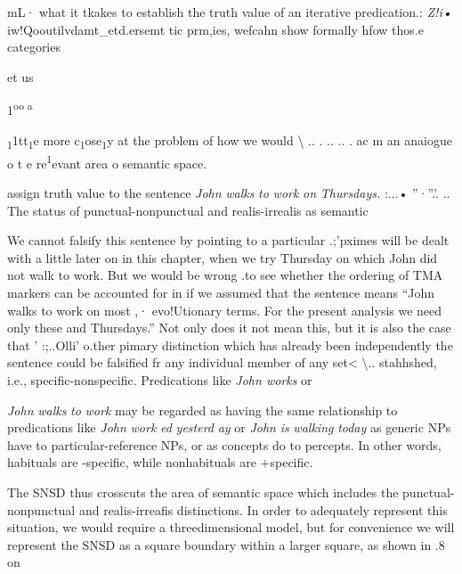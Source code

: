 mL· what it tkakes to establish the truth value of an iterative predication.: \textit{Z}\textit{!i•} iw!Qooutilvdamt\_etd.ersemt tic prm,ies, wefcahn show formally hfow thos.e categories

et us

1\textsuperscript{oo a}

\textsubscript{1}1tt\textsubscript{1}e more c\textsubscript{1}ose\textsubscript{1}y at the problem of how we would {\textbackslash} .. . .. .. . ac m an anaiogue o t e re\textsuperscript{1}evant area o semantic space.

assign truth value to the sentence \textit{John} \textit{wal}\textit{k}\textit{s} \textit{to} \textit{work} \textit{on} \textit{Thursdays. }:...• ''·''.'. .. The status of punctual-nonpunctual and realis-irrealis as semantic

We cannot falsify this sentence by pointing to a particular .;'pximes will be dealt with a little later on in this chapter, when we try Thursday on which John did not walk to work. But we would be wrong .to see whether the ordering of TMA markers can be accounted for in if we assumed that the sentence means ``John walks to work on most ,· evo!Utionary terms. For the present analysis we need only these and Thursdays.'' Not only does it not mean this, but it is also the case that ' :;..Olli' o.ther pimary distinction which has already been independently the sentence could be falsified fr any individual member of any set{\textless} {\textbackslash}.. stahhshed, i.e., specific-nonspecific. Predications like \textit{John works }or

  


 


\textit{John} \textit{walks} \textit{to} \textit{work }may be regarded as having the same relationship to predications like \textit{John} \textit{work} \textit{ed} \textit{yesterd} \textit{ay} or \textit{John} \textit{is} \textit{walking} \textit{today} as generic NPs have to particular-reference NPs, or as concepts do to percepts. In other words, habituals are {}-specific, while nonhabituals are +specific.

The SNSD thus crosscuts the area of semantic space which includes the punctual-nonpunctual and realis-irreafis distinctions. In order to adequately represent this situation, we would require a three\-dimensional model, but for convenience we will represent the SNSD as a square boundary within a larger square, as shown in .8 on

